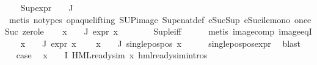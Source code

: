 \begin{isabellebody}
\ \ \isamarkupfalse%
\ {\isachardoublequoteopen}Sup{\isacharparenleft}{\kern0pt}{\isacharparenleft}{\kern0pt}expr{\isacharunderscore}{\kern0pt}{}\ {\isasymcirc}\ {\isasymPhi}{\isacharparenright}{\kern0pt}\ {\isacharbackquote}{\kern0pt}\ J{\isacharparenright}{\kern0pt}\ {\isacharless}{\kern0pt}{\isacharequal}{\kern0pt}\ {}{\isachardoublequoteclose}\isanewline
\ \ \ \ \isamarkupfalse%
\ {\isacharparenleft}{\kern0pt}metis\ {\isacharparenleft}{\kern0pt}no{\isacharunderscore}{\kern0pt}types{\isacharcomma}{\kern0pt}\ opaque{\isacharunderscore}{\kern0pt}lifting{\isacharparenright}{\kern0pt}\ SUP{\isacharunderscore}{\kern0pt}image\ Sup{\isacharunderscore}{\kern0pt}enat{\isacharunderscore}{\kern0pt}def\ eSuc{\isacharunderscore}{\kern0pt}Sup\ eSuc{\isacharunderscore}{\kern0pt}ile{\isacharunderscore}{\kern0pt}mono\ one{\isacharunderscore}{\kern0pt}eSuc\ zero{\isacharunderscore}{\kern0pt}le{\isacharparenright}{\kern0pt}\isanewline
\ \ \isamarkupfalse%
\ {\isachardoublequoteopen}{\isasymforall}x\ {\isasymin}\ {\isasymPhi}\ {\isacharbackquote}{\kern0pt}\ J{\isachardot}{\kern0pt}\ expr{\isacharunderscore}{\kern0pt}{}\ x\ {\isasymle}\ {}{\isachardoublequoteclose}\isanewline
\ \ \ \ \isamarkupfalse%
\ Sup{\isacharunderscore}{\kern0pt}le{\isacharunderscore}{\kern0pt}iff\isanewline
\ \ \ \ \isamarkupfalse%
\ {\isacharparenleft}{\kern0pt}metis\ image{\isacharunderscore}{\kern0pt}comp\ image{\isacharunderscore}{\kern0pt}eqI{\isacharparenright}{\kern0pt}\isanewline
\ \ \isamarkupfalse%
\ {\isacartoucheopen}{\isasymforall}x\ {\isasymin}\ {\isasymPhi}\ {\isacharbackquote}{\kern0pt}\ J{\isachardot}{\kern0pt}\ expr{\isacharunderscore}{\kern0pt}{}\ x\ {\isasymle}\ {}{\isacartoucheclose}\ \isamarkupfalse%
\ {\isachardoublequoteopen}{\isasymforall}x\ {\isasymin}\ {\isasymPhi}\ {\isacharbackquote}{\kern0pt}\ J{\isachardot}{\kern0pt}\ single{\isacharunderscore}{\kern0pt}pos{\isacharunderscore}{\kern0pt}pos\ x{\isachardoublequoteclose}\isanewline
\ \ \ \ \isamarkupfalse%
\ single{\isacharunderscore}{\kern0pt}pos{\isacharunderscore}{\kern0pt}pos{\isacharunderscore}{\kern0pt}expr\ \isamarkupfalse%
\ blast\isanewline
\ \ \isamarkupfalse%
\ \isamarkupfalse%
\ {\isacharquery}{\kern0pt}case\ \isamarkupfalse%
\ {\isacartoucheopen}{\isasymforall}x\ {\isasymin}\ {\isasymPhi}\ {\isacharbackquote}{\kern0pt}\ I{\isachardot}{\kern0pt}\ HML{\isacharunderscore}{\kern0pt}ready{\isacharunderscore}{\kern0pt}sim\ x{\isacartoucheclose}\ hml{\isacharunderscore}{\kern0pt}ready{\isacharunderscore}{\kern0pt}sim{\isachardot}{\kern0pt}intros{\isacharparenleft}{\kern0pt}{}{\isacharparenright}{\kern0pt}\ \isanewline

\end{isabellebody}

